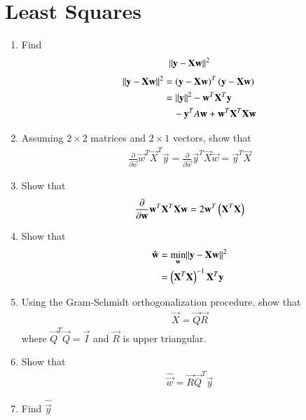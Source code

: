 \documentclass[journal,12pt,twocolumn]{IEEEtran}
\renewcommand\thesection{\arabic{section}}
\begin{document}
\section{Least Squares}
\begin{enumerate}[label=\thesection.\arabic*
,ref=\thesection.\theenumi]
\item Find
\begin{align}
\lVert\mathbf{y}-\mathbf{X}\mathbf{w}\rVert^2
\end{align}
\solution
\begin{align}
\lVert\mathbf{y}-\mathbf{X}\mathbf{w}\rVert^2 &= \left(\mathbf{y}-\mathbf{X}\mathbf{w}\right)^T\left(\mathbf{y}-\mathbf{X}\mathbf{w}\right)
\\
&= \lVert\mathbf{y}\rVert^2 - \mathbf{w}^T\mathbf{X}^T\mathbf{y} 
\\
& \quad - \mathbf{y}^TA\mathbf{w}+\mathbf{w}^T\mathbf{X}^T\mathbf{X}\mathbf{w}
\end{align}
%
\item Assuming $2\times 2$ matrices and $2 \times 1$ vectors, show that
\begin{align}
\frac{\partial}{\partial\vec{w}}\vec{w}^T\vec{X}^T\vec{y} = \frac{\partial}{\partial\vec{w}}\vec{y}^T\vec{X}\vec{w} = 
\vec{y}^T\vec{X}
\end{align}
\item Show that
\begin{align}
\frac{\partial}{\partial\mathbf{w}}\mathbf{w}^T\mathbf{X}^T\mathbf{X}\mathbf{w} = 2\mathbf{w}^T\left(\mathbf{X}^T\mathbf{X}\right)
\end{align}
\item Show that 
\begin{align}
\hat{\mathbf{w}} &= \min_{\mathbf{w}}\lVert\mathbf{y}-\mathbf{X}\mathbf{w}\rVert^2
\\
 &= \left(\mathbf{X}^T\mathbf{X}\right)^{-1}\mathbf{X}^T \mathbf{y}
\end{align}
\item  Using the Gram-Schmidt orthogonalization procedure, show that 
\begin{align}
\vec{X} = \vec{Q}\vec{R}
\end{align}
%
where $\vec{Q}^T\vec{Q} = \vec{I}$ and $\vec{R}$ is upper triangular.
\item Show that  
\begin{align}
\hat{\vec{w}} =\vec{R} \vec{Q}^T \vec{y}
\end{align}
%
\item Find $ \hat{\vec{y}}$

\end{enumerate}
%

%
\end{document}
